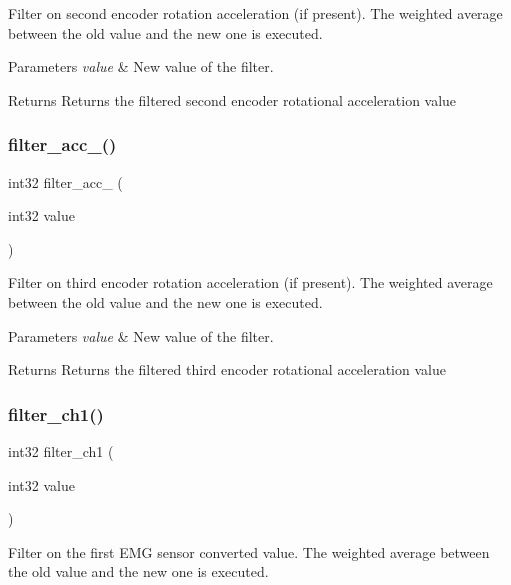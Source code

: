 Filter on second encoder rotation acceleration (if present). The weighted average between the old value and the new one is executed.


\begin{DoxyParams}{Parameters}
{\em value} & New value of the filter.\\
\hline
\end{DoxyParams}
\begin{DoxyReturn}{Returns}
Returns the filtered second encoder rotational acceleration value 
\end{DoxyReturn}
\mbox{\label{utils_8h_a5124047254c64be63f96ae68d2e28149}} 
\subsubsection{filter\+\_\+acc\+\_()}
{\footnotesize\ttfamily int32 filter\+\_\+acc\+\_ (\begin{DoxyParamCaption}\item[{int32}]{value }\end{DoxyParamCaption})}

Filter on third encoder rotation acceleration (if present). The weighted average between the old value and the new one is executed.


\begin{DoxyParams}{Parameters}
{\em value} & New value of the filter.\\
\hline
\end{DoxyParams}
\begin{DoxyReturn}{Returns}
Returns the filtered third encoder rotational acceleration value 
\end{DoxyReturn}
\mbox{\label{utils_8h_ae143e439a41178d1cf10da4920488f86}} 
\subsubsection{filter\+\_\+ch1()}
{\footnotesize\ttfamily int32 filter\+\_\+ch1 (\begin{DoxyParamCaption}\item[{int32}]{value }\end{DoxyParamCaption})}

Filter on the first E\+MG sensor converted value. The weighted average between the old value and the new one is executed.


